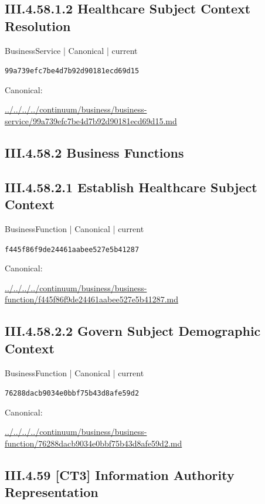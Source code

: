 \documentclass[10pt,a4paper]{article}
\begin{document}
\subsection*{III.4.58.1.2 Healthcare Subject Context Resolution}
{\small BusinessService | Canonical | current}\par
\texttt{99a739efc7be4d7b92d90181ecd69d15}\par
Canonical: \par
{\footnotesize\url{../../../../continuum/business/business-service/99a739efc7be4d7b92d90181ecd69d15.md}}\par
\subsection*{III.4.58.2 Business Functions}
\subsection*{III.4.58.2.1 Establish Healthcare Subject Context}
{\small BusinessFunction | Canonical | current}\par
\texttt{f445f86f9de24461aabee527e5b41287}\par
Canonical: \par
{\footnotesize\url{../../../../continuum/business/business-function/f445f86f9de24461aabee527e5b41287.md}}\par
\subsection*{III.4.58.2.2 Govern Subject Demographic Context}
{\small BusinessFunction | Canonical | current}\par
\texttt{76288dacb9034e0bbf75b43d8afe59d2}\par
Canonical: \par
{\footnotesize\url{../../../../continuum/business/business-function/76288dacb9034e0bbf75b43d8afe59d2.md}}\par
\subsection*{III.4.59 [CT3] Information Authority Representation}
\end{document}
